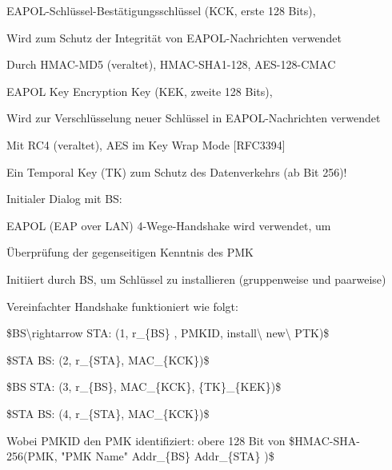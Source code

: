 \documentclass[a4paper]{article}
\begin{document}
\begin{multicols}{3}
\begin{itemize*}
            \begin{itemize*}
                  \item EAPOL-Schlüssel-Bestätigungsschlüssel (KCK, erste 128 Bits),
                  \begin{itemize*} \item Wird zum Schutz der Integrität von EAPOL-Nachrichten verwendet \item Durch HMAC-MD5 (veraltet), HMAC-SHA1-128, AES-128-CMAC \end{itemize*}
                  \item EAPOL Key Encryption Key (KEK, zweite 128 Bits),
                  \begin{itemize*} \item Wird zur Verschlüsselung neuer Schlüssel in EAPOL-Nachrichten verwendet \item Mit RC4 (veraltet), AES im Key Wrap Mode {[}RFC3394{]} \end{itemize*}
                  \item Ein Temporal Key (TK) zum Schutz des Datenverkehrs (ab Bit 256)!
            \end{itemize*}
            \item
            Initialer Dialog mit BS:

            \begin{itemize*}
                  \item EAPOL (EAP over LAN) 4-Wege-Handshake wird verwendet, um
                  \begin{itemize*} \item Überprüfung der gegenseitigen Kenntnis des PMK \item Initiiert durch BS, um Schlüssel zu installieren (gruppenweise und paarweise) \end{itemize*}
                  \item Vereinfachter Handshake funktioniert wie folgt:
                  \begin{enumerate*} \def\labelenumi{\arabic{enumi}.} \item \$BS\textbackslash rightarrow STA: (1, r\_\{BS\} , PMKID, install\textbackslash{} new\textbackslash{} PTK)\$ \item \$STA BS: (2, r\_\{STA\}, MAC\_\{KCK\})\$ \item \$BS STA: (3, r\_\{BS\}, MAC\_\{KCK\}, \{TK\}\_\{KEK\})\$ \item \$STA BS: (4, r\_\{STA\}, MAC\_\{KCK\})\$ \end{enumerate*}
                  \item Wobei PMKID den PMK identifiziert: obere 128 Bit von \$HMAC-SHA-256(PMK, "PMK Name" \textbar\textbar{} Addr\_\{BS\} \textbar\textbar{} Addr\_\{STA\} )\$
            \end{itemize*}
      \end{itemize*}



\end{multicols}
\end{document}
